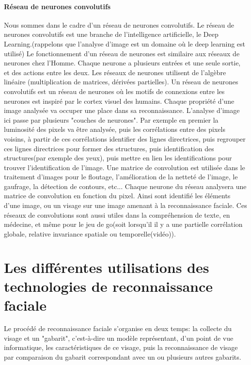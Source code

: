 \documentclass[12pt,french]{article}
\theoremstyle{plain}
\theoremstyle{definition}
\begin{document}
\subsection{Réseau de neurones convolutifs}
Nous sommes dans le cadre d'un réseau de neurones convolutifs. Le réseau de neurones convolutifs est une branche de l'intelligence artificielle, le Deep Learning.(rappelons que l'analyse d'image est un domaine où le deep learning est utilisé) Le fonctionnement d'un réseau de neurones est similaire aux réseaux de neurones chez l'Homme. Chaque neurone a plusieurs entrées et une seule sortie, et des actions entre les deux. Les réseaux de neurones utilisent de l'algèbre linéaire (multiplication de matrices, dérivées partielles). Un réseau de neurones convolutifs est un réseau de neurones où les motifs de connexions entre les neurones est inspiré par le cortex visuel des humains. Chaque propriété d'une image analysée va occuper une place dans sa reconnaissance. L'analyse d'image ici passe par plusieurs "couches de neurones". Par exemple en premier la luminosité des pixels va être analysée, puis les corrélations entre des pixels voisins, à partir de ces corrélations identifier des lignes directrices, puis regrouper ces lignes directrices pour former des structures, puis identification des structures(par exemple des yeux), puis mettre en lien les identifications pour trouver l'identification de l'image.
Une matrice de convolution est utilisée dans le traitement d'images pour le floutage, l'amélioration de la netteté de l'image, le gaufrage, la détection de contours, etc...
Chaque neurone du réseau analysera une matrice de convolution en fonction du pixel.
Ainsi sont identifié les éléments d'une image, ou un visage sur une image amenant à la reconnaissance faciale.
Ces réseaux de convolutions sont aussi utiles dans la compréhension de texte, en médecine, et même pour le jeu de go(soit lorsqu'il il y a une partielle corrélation globale, relative invariance spatiale ou temporelle(vidéo)).


\newpage

\part{Les différentes utilisations des technologies de reconnaissance faciale}

Le procédé de reconnaissance faciale s'organise en deux temps: la collecte du visage et un "gabarit", c'est-à-dire un modèle représentant,
d'un point de vue informatique, les caractéristiques de ce visage, puis la reconnaissance de visage par comparaison du gabarit correspondant avec un ou plusieurs autres gabarits.
\end{document}
